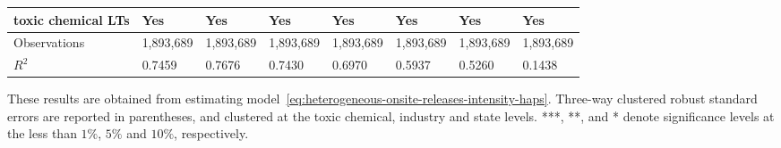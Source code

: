 \begin{table}[H]
{\begin{tabular}{@{}llllllll@{}}
            toxic chemical LTs              & Yes       & Yes           & Yes       & Yes          & Yes             & Yes           & Yes                 \\\midrule\midrule
            Observations                    & 1,893,689 & 1,893,689     & 1,893,689 & 1,893,689    & 1,893,689       & 1,893,689     & 1,893,689           \\
            $R^2$                           & 0.7459    & 0.7676        & 0.7430    & 0.6970       & 0.5937          & 0.5260        & 0.1438              \\ \bottomrule\bottomrule
        \end{tabular}%
    }
    \begin{minipage}{18cm}
        \vspace{0.05in}
        These results are obtained from estimating model~\ref{eq:heterogeneous-onsite-releases-intensity-haps}. Three-way clustered robust standard errors are reported in parentheses, and clustered at the toxic chemical, industry and state levels. ***, **, and * denote significance levels at the less than $1\%$, $5\%$ and $10\%$, respectively.
    \end{minipage}
\end{table}